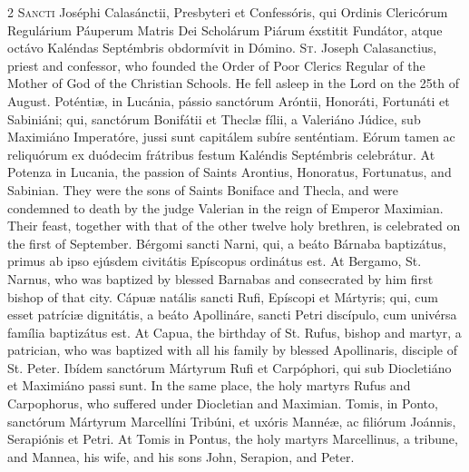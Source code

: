 \begin{paracol}{2}
\lettrine[lines=2]{S}{ancti} Joséphi 
 Calasánctii, Presbyteri et Confessóris, qui Ordinis Clericórum Regulárium 
 Páuperum Matris Dei Scholárum Piárum éxstitit Fundátor, atque octávo 
 Kaléndas Septémbris obdormívit in Dómino.
\switchcolumn
{}
\lettrine[lines=2]{S}{t.} Joseph Calasanctius, priest and 
 confessor, who founded the Order of Poor Clerics Regular of the Mother of 
 God of the Christian Schools. He fell asleep in the Lord on the 25th 
 of August.
\switchcolumn*
{}
Poténtiæ, in Lucánia, 
 pássio sanctórum Aróntii, Honoráti, Fortunáti et Sabiniáni; qui, sanctórum 
 Bonifátii et Theclæ fílii, a Valeriáno Júdice, sub Maximiáno Imperatóre, 
 jussi sunt capitálem subíre senténtiam. Eórum tamen ac reliquórum ex 
 duódecim frátribus festum Kaléndis Septémbris celebrátur.
\switchcolumn
{}
At Potenza in Lucania, the passion 
 of Saints Arontius, Honoratus, Fortunatus, and Sabinian. They were the 
 sons of Saints Boniface and Thecla, and were condemned to death by the judge 
 Valerian in the reign of Emperor Maximian. Their feast, together with 
 that of the other twelve holy brethren, is celebrated on the first of 
 September.
\switchcolumn*
{}
Bérgomi sancti Narni, 
 qui, a beáto Bárnaba baptizátus, primus ab ipso ejúsdem civitátis Epíscopus 
 ordinátus est.
\switchcolumn
{}
At Bergamo, St. Narnus, who was 
 baptized by blessed Barnabas and consecrated by him first bishop of that 
 city.
\switchcolumn*
{}
Cápuæ natális sancti 
 Rufi, Epíscopi et Mártyris; qui, cum esset patríciæ dignitátis, a beáto 
 Apollináre, sancti Petri discípulo, cum univérsa família baptizátus est.
\switchcolumn
{}
At Capua, the birthday of St. Rufus, 
 bishop and martyr, a patrician, who was baptized with all his family by 
 blessed Apollinaris, disciple of St. Peter.
\switchcolumn*
{}
Ibídem sanctórum 
 Mártyrum Rufi et Carpóphori, qui sub Diocletiáno et Maximiáno passi sunt.
\switchcolumn
{}
In the same place, the holy martyrs 
 Rufus and Carpophorus, who suffered under Diocletian and Maximian.
\switchcolumn*
{}
Tomis, in Ponto, 
 sanctórum Mártyrum Marcellíni Tribúni, et uxóris Mannéæ, ac filiórum Joánnis, 
 Serapiónis et Petri.
\switchcolumn
{}
At Tomis in Pontus, the holy martyrs 
 Marcellinus, a tribune, and Mannea, his wife, and his sons John, Serapion, 
 and Peter.

\end{paracol}
